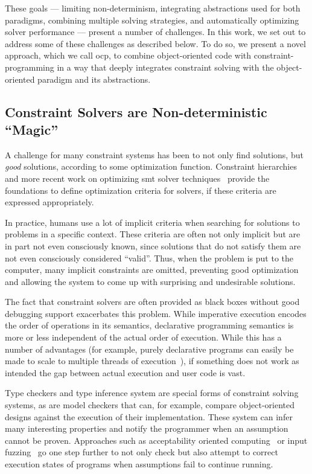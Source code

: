 These goals --- limiting non-determinism, integrating abstractions used for both
paradigms, combining multiple solving strategies, and automatically optimizing
solver performance --- present a number of challenges. In this work, we set out
to address some of these challenges as described below. To do so, we present a
novel approach, which we call \ac{ocp}, to combine object-oriented code with
constraint-programming in a way that deeply integrates constraint solving with
the object-oriented paradigm and its abstractions.

\subsection*{Constraint Solvers are Non-deterministic ``Magic''}
\label{sec:avoid-surpr-solut}

A challenge for many constraint systems has been to not only find solutions, but
\emph{good} solutions, according to some optimization function. Constraint
hierarchies~\cite{borning-split-stay-2000,borning1992constraint,hosobe-cp-1996,vander-zanden-toplas-1996}
and more recent work on optimizing \gls{smt} solver techniques~\cite{bjornernuz,cimatti2010,Nieuwenhuis2006,Sebastiani2012} provide the
foundations to define optimization criteria for solvers, if these criteria are
expressed appropriately.

In practice, humans use a lot of implicit criteria when searching for solutions
to problems in a specific context. These criteria are often not only
implicit but are in part not even consciously known, since solutions that do
not satisfy them are not even consciously considered ``valid''. Thus, when the
problem is put to the computer, many implicit constraints are omitted,
preventing good optimization and allowing the system to come up with surprising
and undesirable solutions.

The fact that constraint solvers are often provided as black boxes without good
debugging support exacerbates this problem. While imperative execution encodes
the order of operations in its semantics, declarative programming semantics is
more or less independent of the actual order of execution. While this has a
number of advantages (for example, purely declarative programs can easily be
made to scale to multiple threads of execution~\cite{saraswat-popl-1991}), if
something does not work as intended the gap between actual execution and user
code is vast.

Type checkers and type inference system are special forms of constraint solving
systems, as are model checkers that can, for example, compare object-oriented
designs against the execution of their implementation. These system can infer
many interesting properties and notify the programmer when an assumption cannot
be proven. Approaches such as acceptability oriented
computing~\cite{demsky2006goal} or input
fuzzing~\cite{Carbin:2010:AIC:1831708.1831713} go one step further to not only
check but also attempt to correct execution states of programs when assumptions
fail to continue running.

